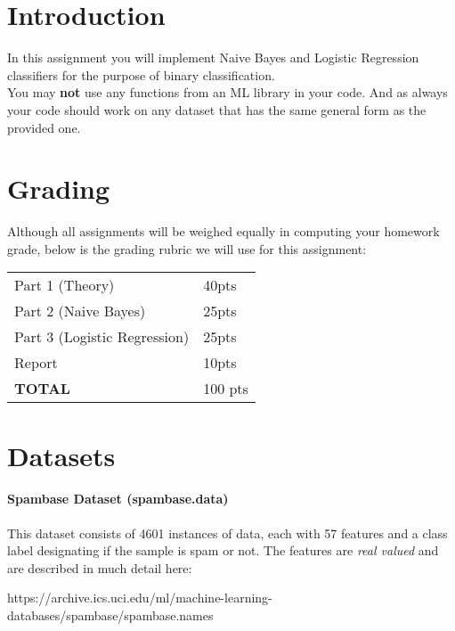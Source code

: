 \documentclass[12pt]{article}
\begin{document}
\maketitle


\section*{Introduction}
In this assignment you will implement Naive Bayes and Logistic Regression classifiers for the purpose of binary classification.\\

\noindent
You may \textbf{not} use any functions from an ML library in your code.  And as always your code should work on any dataset that has the same general form as the provided one.

\section*{Grading}
Although all assignments will be weighed equally in computing your homework grade, below is the grading rubric we will use for this assignment:

\begin{table}[h]
\begin{center}
\begin{tabular}{|l|l|}
\hline
Part 1 (Theory) & 40pts \\
Part 2 (Naive Bayes)	& 25pts \\
Part 3 (Logistic Regression)	& 25pts \\
Report & 10pts\\
\hline
\textbf{TOTAL} & 100 pts\\
\hline
\end{tabular}
\end{center}
\end{table}

\newpage
\section*{Datasets}
\paragraph{Spambase Dataset  (spambase.data)}
This dataset consists of 4601 instances of data, each with 57 features and a class label designating if the sample is spam or not.
The features are \emph{real valued} and are described in much detail here:
\begin{center}
  https://archive.ics.uci.edu/ml/machine-learning-databases/spambase/spambase.names\\
\end{center}
\end{document}
